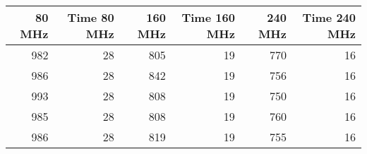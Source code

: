 \begin{tabular}{rrrrrr}
\toprule
 80 MHz &  Time 80 MHz &  160 MHz &  Time 160 MHz  &  240 MHz &  Time 240 MHz \\
\midrule
    982 &           28 &      805 &             19 &      770 &            16 \\
    986 &           28 &      842 &             19 &      756 &            16 \\
    993 &           28 &      808 &             19 &      750 &            16 \\
    985 &           28 &      808 &             19 &      760 &            16 \\
    986 &           28 &      819 &             19 &      755 &            16 \\
\bottomrule
\end{tabular}
